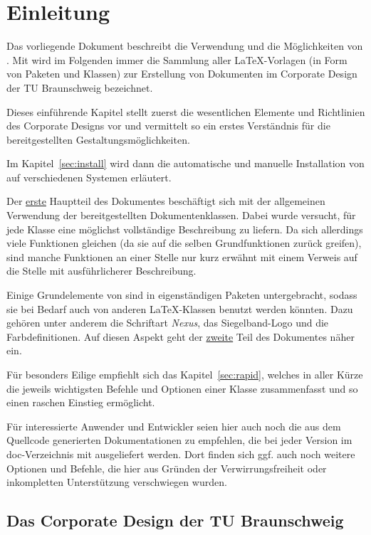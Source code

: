 \chapter{Einleitung}

Das vorliegende Dokument beschreibt die Verwendung und die Möglichkeiten von \tubslatex.
Mit \tubslatex wird im Folgenden immer die Sammlung aller \LaTeX-Vorlagen
(in Form von Paketen und Klassen) zur Erstellung von Dokumenten im
Corporate Design der TU Braunschweig bezeichnet.

Dieses einführende Kapitel stellt zuerst die wesentlichen Elemente und Richtlinien
des Corporate Designs vor und vermittelt so ein erstes Verständnis für
die bereitgestellten Gestaltungsmöglichkeiten.

Im Kapitel~\ref{sec:install} wird dann die automatische und manuelle
Installation von \tubslatex auf verschiedenen Systemen erläutert.

Der \hyperlink{part:user}{erste} Hauptteil des Dokumentes beschäftigt sich mit
der allgemeinen Verwendung der bereitgestellten Dokumentenklassen.
Dabei wurde versucht, für jede Klasse eine möglichst vollständige Beschreibung
zu liefern. Da sich allerdings viele Funktionen gleichen
(da sie auf die selben Grundfunktionen zurück greifen),
sind manche Funktionen an einer Stelle nur kurz erwähnt mit einem Verweis
auf die Stelle mit ausführlicherer Beschreibung.

Einige Grundelemente von \tubslatex sind in eigenständigen Paketen untergebracht,
sodass sie bei Bedarf auch von anderen \LaTeX-Klassen benutzt werden könnten.
Dazu gehören unter anderem die Schriftart \emph{Nexus}, das Siegelband-Logo
und die Farbdefinitionen.
Auf diesen Aspekt geht der \hyperlink{part:packages}{zweite}
Teil des Dokumentes näher ein.

Für besonders Eilige empfiehlt sich das Kapitel~\ref{sec:rapid},
welches in aller Kürze die jeweils wichtigsten Befehle und Optionen einer Klasse
zusammenfasst und so einen raschen Einstieg ermöglicht.

Für interessierte Anwender und Entwickler seien hier auch noch die
aus dem Quellcode generierten Dokumentationen zu empfehlen, die bei jeder
Version im doc-Verzeichnis mit ausgeliefert werden. Dort finden sich
ggf. auch noch weitere Optionen und Befehle, die hier aus Gründen der
Verwirrungsfreiheit oder inkompletten Unterstützung verschwiegen wurden.

\clearpage
\section{Das Corporate Design der TU Braunschweig}\label{sec:intro:dascddertubs}

